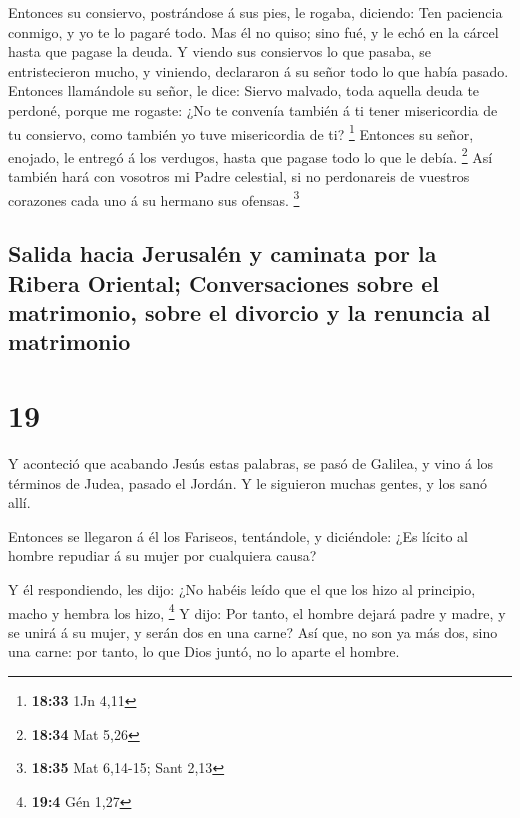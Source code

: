  Entonces su consiervo, postrándose á sus pies, le
rogaba, diciendo: Ten paciencia conmigo, y yo te lo pagaré todo.
 Mas él no quiso; sino fué, y le echó en la cárcel hasta
que pagase la deuda.  Y viendo sus consiervos lo que
pasaba, se entristecieron mucho, y viniendo, declararon á su señor todo
lo que había pasado.  Entonces llamándole su señor, le
dice: Siervo malvado, toda aquella deuda te perdoné, porque me rogaste:
 ¿No te convenía también á ti tener misericordia de tu
consiervo, como también yo tuve misericordia de ti? \footnote{\textbf{18:33}
  1Jn 4,11}  Entonces su señor, enojado, le entregó á los
verdugos, hasta que pagase todo lo que le debía. \footnote{\textbf{18:34}
  Mat 5,26}  Así también hará con vosotros mi Padre
celestial, si no perdonareis de vuestros corazones cada uno á su hermano
sus ofensas. \footnote{\textbf{18:35} Mat 6,14-15; Sant 2,13}

\hypertarget{salida-hacia-jerusaluxe9n-y-caminata-por-la-ribera-oriental-conversaciones-sobre-el-matrimonio-sobre-el-divorcio-y-la-renuncia-al-matrimonio}{%
\subsection{Salida hacia Jerusalén y caminata por la Ribera Oriental;
Conversaciones sobre el matrimonio, sobre el divorcio y la renuncia al
matrimonio}\label{salida-hacia-jerusaluxe9n-y-caminata-por-la-ribera-oriental-conversaciones-sobre-el-matrimonio-sobre-el-divorcio-y-la-renuncia-al-matrimonio}}

\hypertarget{section-18}{%
\section{19}\label{section-18}}

 Y aconteció que acabando Jesús estas palabras, se pasó de
Galilea, y vino á los términos de Judea, pasado el Jordán.
 Y le siguieron muchas gentes, y los sanó allí.

 Entonces se llegaron á él los Fariseos, tentándole, y
diciéndole: ¿Es lícito al hombre repudiar á su mujer por cualquiera
causa?

 Y él respondiendo, les dijo: ¿No habéis leído que el que
los hizo al principio, macho y hembra los hizo, \footnote{\textbf{19:4}
  Gén 1,27}  Y dijo: Por tanto, el hombre dejará padre y
madre, y se unirá á su mujer, y serán dos en una carne? 
Así que, no son ya más dos, sino una carne: por tanto, lo que Dios
juntó, no lo aparte el hombre.

